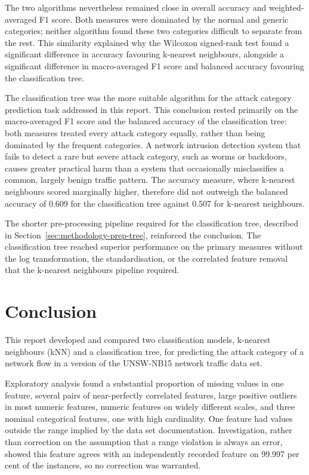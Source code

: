 \documentclass[10pt,conference]{IEEEtran}
\begin{document}
The two algorithms nevertheless remained close in overall accuracy and weighted-averaged F1 score. Both measures were dominated by the normal and generic categories; neither algorithm found these two categories difficult to separate from the rest. This similarity explained why the Wilcoxon signed-rank test found a significant difference in accuracy favouring k-nearest neighbours, alongside a significant difference in macro-averaged F1 score and balanced accuracy favouring the classification tree.

The classification tree was the more suitable algorithm for the attack category prediction task addressed in this report. This conclusion rested primarily on the macro-averaged F1 score and the balanced accuracy of the classification tree: both measures treated every attack category equally, rather than being dominated by the frequent categories. A network intrusion detection system that fails to detect a rare but severe attack category, such as worms or backdoors, causes greater practical harm than a system that occasionally misclassifies a common, largely benign traffic pattern. The accuracy measure, where k-nearest neighbours scored marginally higher, therefore did not outweigh the balanced accuracy of 0.609 for the classification tree against 0.507 for k-nearest neighbours.

The shorter pre-processing pipeline required for the classification tree, described in Section~\ref{sec:methodology-prep-tree}, reinforced the conclusion. The classification tree reached superior performance on the primary measures without the log transformation, the standardisation, or the correlated feature removal that the k-nearest neighbours pipeline required.

\section{Conclusion}
\label{sec:conclusion}

This report developed and compared two classification models, k-nearest neighbours (kNN) and a classification tree, for predicting the attack category of a network flow in a version of the UNSW-NB15 network traffic data set.

Exploratory analysis found a substantial proportion of missing values in one feature, several pairs of near-perfectly correlated features, large positive outliers in most numeric features, numeric features on widely different scales, and three nominal categorical features, one with high cardinality. One feature had values outside the range implied by the data set documentation. Investigation, rather than correction on the assumption that a range violation is always an error, showed this feature agrees with an independently recorded feature on 99.997 per cent of the instances, so no correction was warranted.
\end{document}
